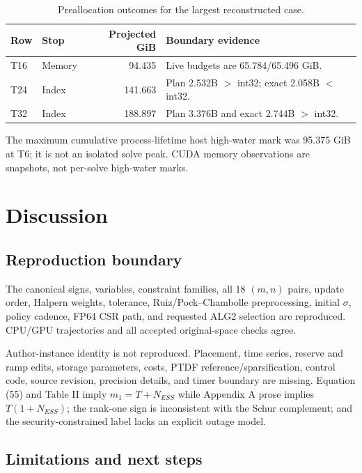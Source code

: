 \documentclass[10pt,journal]{IEEEtran}
\begin{document}
\begin{table}[!t]
\caption{Preallocation outcomes for the largest reconstructed case.}
\label{tab:resources}
\centering
\scriptsize
\setlength{\tabcolsep}{2.2pt}
\renewcommand{\arraystretch}{0.92}
\begin{tabular}{@{}llrp{}@{}}
\toprule
Row & Stop & Projected GiB & Boundary evidence \\
\midrule
T16 & Memory & 94.435 & Live budgets are 65.784/65.496 GiB. \\
T24 & Index & 141.663 & Plan 2.532B $>$ int32; exact 2.058B $<$ int32. \\
T32 & Index & 188.897 & Plan 3.376B and exact 2.744B $>$ int32. \\
\bottomrule
\end{tabular}
\end{table}

The maximum cumulative process-lifetime host high-water mark was 95.375 GiB
at T6; it is not an isolated solve peak. CUDA memory observations are
snapshots, not per-solve high-water marks.

\section{Discussion}

\subsection{Reproduction boundary}

The canonical signs, variables, constraint families, all 18 $(m,n)$ pairs,
update order, Halpern weights, tolerance, Ruiz/Pock--Chambolle preprocessing,
initial $\sigma$, policy cadence, FP64 CSR path, and requested ALG2 selection
are reproduced. CPU/GPU trajectories and all accepted original-space checks
agree.

Author-instance identity is not reproduced. Placement, time series, reserve
and ramp edits, storage parameters, costs, PTDF reference/sparsification,
control code, source revision, precision details, and timer boundary are
missing. Equation (55) and Table II imply $m_1=T+N_{ESS}$ while Appendix A
prose implies $T(1+N_{ESS})$; the rank-one sign is inconsistent with the Schur
complement; and the security-constrained label lacks an explicit outage model.

\subsection{Limitations and next steps}
\end{document}
